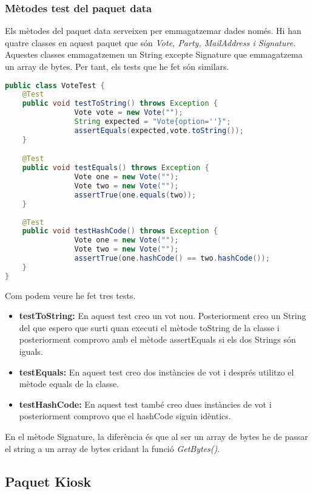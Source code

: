 \documentclass[11pt]{article}
\begin{document}
	\subsubsection{Mètodes test del paquet data}
	Els mètodes del paquet data serveixen per emmagatzemar dades només. Hi han quatre classes en aquest paquet que són \textit{Vote, Party, MailAddress i Signature}. Aquestes classes emmagatzemen un String excepte Signature que emmagatzema un array de bytes. Per tant, els tests que he fet són similars.
	\\
	\begin{lstlisting}[basicstyle=\ttfamily\scriptsize,language=Java]
public class VoteTest {
   	@Test
   	public void testToString() throws Exception {
    			Vote vote = new Vote("");
    			String expected = "Vote{option=''}";
    			assertEquals(expected,vote.toString());
   	}

   	@Test
   	public void testEquals() throws Exception {
    			Vote one = new Vote("");
    			Vote two = new Vote("");
    			assertTrue(one.equals(two));
   	}
   		
   	@Test
   	public void testHashCode() throws Exception {
    			Vote one = new Vote("");
    			Vote two = new Vote("");
    			assertTrue(one.hashCode() == two.hashCode());
   	}
}   	
	\end{lstlisting}
	Com podem veure he fet tres tests.
	\begin{itemize}
		\item \textbf{testToString:} En aquest test creo un vot nou. Posteriorment creo un String del que espero que surti quan executi el mètode toString de la classe i posteriorment comprovo amb el mètode assertEquals si els dos Strings són iguals.
		\item \textbf{testEquals:} En aquest test creo dos instàncies de vot i després utilitzo el mètode equals de la classe.
		\item \textbf{testHashCode:} En aquest test també creo dues instàncies de vot i posteriorment comprovo que el hashCode siguin idèntics.
	\end{itemize}
	En el mètode Signature, la diferència és que al ser un array de bytes he de passar el string a un array de bytes cridant la funció \textit{GetBytes()}.
\newpage
\subsection{Paquet Kiosk}
\end{document}
